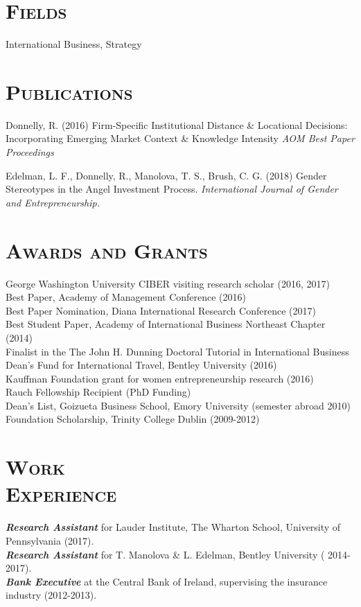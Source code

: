 \documentclass[margin, 12pt]{res}
\begin{document}
\begin{resume}
\section{\normalfont\textsc{Fields}}
International Business, Strategy

\section{\normalfont\textsc{Publications}}
Donnelly, R. (2016) Firm-Specific Institutional Distance \& Locational Decisions: Incorporating Emerging Market Context \& Knowledge Intensity  \textit{AOM  Best Paper Proceedings}

Edelman, L. F., Donnelly, R., Manolova, T. S., Brush, C. G. (2018) Gender Stereotypes in the Angel Investment Process. \textit{International Journal of Gender and Entrepreneurship.} 



\section{\normalfont\textsc{Awards and Grants}}
George Washington University CIBER visiting research scholar (2016, 2017) \\[0.2em]
Best Paper, Academy of Management Conference (2016)\\[0.2em]
Best Paper Nomination, Diana International Research Conference (2017)\\[0.2em]
Best Student Paper, Academy of International Business Northeast Chapter (2014)\\[0.2em]
Finalist in the The John H. Dunning Doctoral Tutorial in International Business \\ [0.2em]
Dean's Fund for International Travel, Bentley University (2016) \\
[0.2em]
Kauffman Foundation grant for women entrepreneurship research (2016) \\
[0.2em]
Rauch Fellowship Recipient (PhD Funding) \\
[0.2em]
Dean's List, Goizueta Business School, Emory University (semester abroad 2010)
Foundation Scholarship, Trinity College Dublin (2009-2012) 






\section{\normalfont\textsc{Work \\Experience}}
\textbf{\textit{Research Assistant}} for Lauder Institute, The Wharton School, University of Pennsylvania (2017). \\
\textbf{\textit{Research Assistant}} for T. Manolova \& L. Edelman, Bentley University ( 2014-2017). \\
\textbf{\textit{Bank Executive}} at the Central Bank of Ireland, supervising the insurance industry (2012-2013). 



\end{resume}
\end{document}
